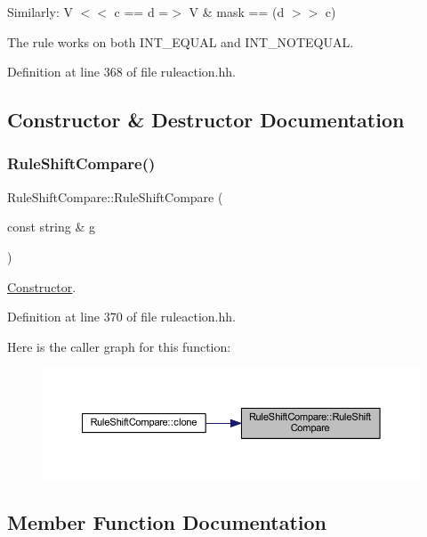 Similarly\+: {\ttfamily V $<$$<$ c == d =$>$ V \& mask == (d $>$$>$ c)}

The rule works on both I\+N\+T\+\_\+\+E\+Q\+U\+AL and I\+N\+T\+\_\+\+N\+O\+T\+E\+Q\+U\+AL. 

Definition at line 368 of file ruleaction.\+hh.



\subsection{Constructor \& Destructor Documentation}
\mbox{\label{class_rule_shift_compare_ac354a9d13a848a27d0bbe78014fe6a7f}} 
\subsubsection{\texorpdfstring{RuleShiftCompare()}{RuleShiftCompare()}}
{\footnotesize\ttfamily Rule\+Shift\+Compare\+::\+Rule\+Shift\+Compare (\begin{DoxyParamCaption}\item[{const string \&}]{g }\end{DoxyParamCaption})\hspace{0.3cm}{\ttfamily [inline]}}



\mbox{\hyperlink{class_constructor}{Constructor}}. 



Definition at line 370 of file ruleaction.\+hh.

Here is the caller graph for this function\+:
\nopagebreak
\begin{figure}[H]
\begin{center}
\leavevmode
\includegraphics[width=350pt]{class_rule_shift_compare_ac354a9d13a848a27d0bbe78014fe6a7f_icgraph}
\end{center}
\end{figure}


\subsection{Member Function Documentation}
\mbox{\label{class_rule_shift_compare_a8104a2a2506b0a63aeba91f4a9d505ba}} 
